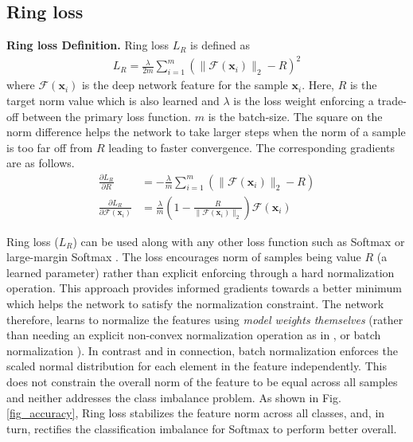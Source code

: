 \documentclass[10pt,twocolumn,letterpaper]{article}
\begin{document}
\subsection{Ring loss}

\textbf{Ring loss Definition. } Ring loss $L_R$ is defined as
\begin{align} 
L_R = \frac{\lambda}{2m} \sum_{i=1}^m (\|\mathcal{F}(\mathbf{x}_i)\|_2  -  R)^2
\end{align}
where $\mathcal{F}(\mathbf{x}_i)$ is the deep network feature for the sample $\mathbf{x}_i$.  Here, $R$ is the target norm value which is also learned and $\lambda$ is the loss weight enforcing a trade-off between the primary loss function. $m$ is the batch-size. The square on the norm difference helps the network to take larger steps when the norm of a sample is too far off from $R$ leading to faster convergence. The corresponding gradients are as follows.
\begin{align}
\frac{\partial L_R}{\partial R } &= -\frac{\lambda}{m}\sum_{i=1}^m (\|\mathcal{F}(\mathbf{x}_i)\|_2  -  R) \\ \frac{\partial L_R}{\partial \mathcal{F}(\mathbf{x}_i) }&=  \frac{\lambda}{m}  \left(1  -  \frac{R}{\|\mathcal{F}(\mathbf{x}_i)\|_2}  \right) \mathcal{F}(\mathbf{x}_i) 
\end{align}



Ring loss ($L_R$) can be used along with any other loss function such as Softmax or large-margin Softmax \cite{liu2017sphereface}. The loss encourages norm of samples being value $R$ (a learned parameter) rather than explicit enforcing through a hard normalization operation. This approach provides informed gradients towards a better minimum which helps the network to satisfy the normalization constraint. The network therefore, learns to normalize the features using \textit{model weights themselves} (rather than needing an explicit non-convex normalization operation as in \cite{ranjan2017l2}, or batch normalization \cite{ioffe2015batch}). In contrast and in connection, batch normalization \cite{ioffe2015batch} enforces the scaled normal distribution for each element in the feature independently. This does not constrain the overall norm of the feature to be equal across all samples and neither addresses the class imbalance problem. As shown in Fig. \ref{fig_accuracy}, Ring loss stabilizes the feature norm across all classes, and, in turn, rectifies the classification imbalance for Softmax to perform better overall. 
\end{document}
